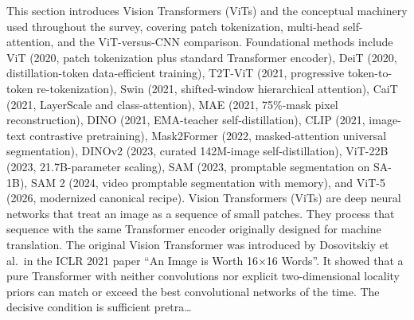 This section introduces Vision Transformers (ViTs) and the conceptual machinery used throughout the survey, covering patch tokenization, multi-head self-attention, and the ViT-versus-CNN comparison. Foundational methods include ViT (2020, patch tokenization plus standard Transformer encoder), DeiT (2020, distillation-token data-efficient training), T2T-ViT (2021, progressive token-to-token re-tokenization), Swin (2021, shifted-window hierarchical attention), CaiT (2021, LayerScale and class-attention), MAE (2021, 75\%-mask pixel reconstruction), DINO (2021, EMA-teacher self-distillation), CLIP (2021, image-text contrastive pretraining), Mask2Former (2022, masked-attention universal segmentation), DINOv2 (2023, curated 142M-image self-distillation), ViT-22B (2023, 21.7B-parameter scaling), SAM (2023, promptable segmentation on SA-1B), SAM 2 (2024, video promptable segmentation with memory), and ViT-5 (2026, modernized canonical recipe). Vision Transformers (ViTs) are deep neural networks that treat an image as a sequence of small patches. They process that sequence with the same Transformer encoder originally designed for machine translation. The original Vision Transformer was introduced by Dosovitskiy et al.~in the ICLR 2021 paper ``An Image is Worth 16×16 Words''. It showed that a pure Transformer with neither convolutions nor explicit two-dimensional locality priors can match or exceed the best convolutional networks of the time. The decisive condition is sufficient pretra\ldots{}
